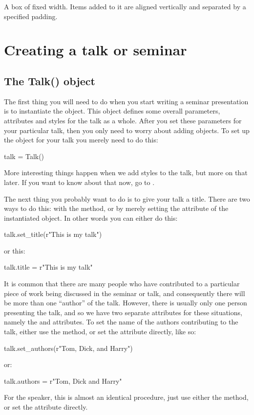 A box of fixed width.  Items added to it are aligned vertically and
separated by a specified padding.

\section{Creating a talk or seminar}

\subsection{The Talk() object}

The first thing you will need to do when you start writing a seminar
presentation is to instantiate the  object.  This object defines
some overall parameters, attributes and styles for the talk as a whole.
After you set these parameters for your particular talk, then you only need
to worry about adding  objects.  To set up the 
object for your talk you merely need to do this:
\begin{python}
talk = Talk()
\end{python}
More interesting things happen when we add styles to the talk, but more on
that later.  If you want to know about that now, go to .

The next thing you probably want to do is to give your talk a title.  There
are two ways to do this: with the  method, or by merely
setting the  attribute of the instantiated  object.
In other words you can either do this:
\begin{python}
talk.set_title(r"This is my talk")
\end{python}
or this:
\begin{python}
talk.title = r"This is my talk"
\end{python}

It is common that there are many people who have contributed to a particular
piece of work being discussed in the seminar or talk, and consequently there
will be more than one ``author'' of the talk.  However, there is usually
only one person presenting the talk, and so we have two separate attributes
for these situations, namely the  and  attributes.
To set the name of the authors contributing to the talk, either use the
 method, or set the attribute directly, like so:
\begin{python}
talk.set_authors(r"Tom, Dick, and Harry")
\end{python}
or:
\begin{python}
talk.authors = r"Tom, Dick and Harry"
\end{python}
For the speaker, this is almost an identical procedure, just use either the
 method, or set the  attribute directly.

